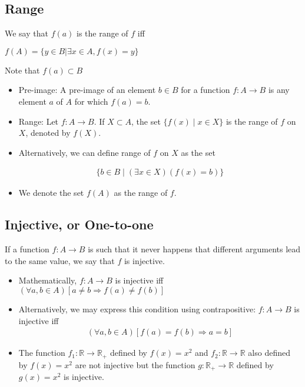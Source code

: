 \documentclass[12pt,a4paper,fleqn]{article}
\begin{document}
  \subsection{Range} 
  We say that \(f(a)\) is the range of \(f\) iff

  \(f(A)=\{y \in B | \exists x \in A, f(x) = y\} \)
  
  Note that \(f(a) \subset B \)

  \begin{itemize}
    \item  Pre-image: A pre-image of an element \(b \in B\) for a function \(f: A \rightarrow B\) is any element \(a\) of \(A\) for which \(f(a)=b\).
    \item Range: Let \(f: A \rightarrow B\). If \(X \subset A\), the set \( \{ f(x) \mid x \in X\} \) is the range of \(f\) on \(X\), denoted by \(f(X)\).
    \item Alternatively, we can define range of \(f\) on \(X\) as the set
    
    \begin{align*}
    \{b \in B \mid(\exists x \in X)(f(x)=b)\}
    \end{align*}
    
    \item We denote the set \(f(A)\) as the range of \(f\).
  \end{itemize}
   \subsection{Injective, or One-to-one} 
   If a function \(f: A \rightarrow B\) is such that it never happens that different arguments lead to the same value, we say that \(f\) is injective.
   \begin{itemize}
       \item Mathematically, \(f: A \rightarrow B\) is injective iff \((\forall a, b \in A)[a \neq b \Rightarrow f(a) \neq f(b)]\)
       
       \item Alternatively, we may express this condition using contrapositive: \(f: A \rightarrow B\) is injective iff
        \begin{align*}
       (\forall a, b \in A)[f(a)=f(b) \Rightarrow a=b]
       \end{align*}

       \item The function \(f_{1}: \mathbb{R} \rightarrow \mathbb{R}_{+}\) defined by \(f(x)=x^2\) and \(f_{2}:\mathbb{R} \to \mathbb{R}\) also defined by \(f(x)=x^2\) are not injective but the function \(g: \mathbb{R}_{+} \rightarrow \mathbb{R}\) defined by \(g(x)=x^2\) is injective.
       \end{itemize}
\end{document}
